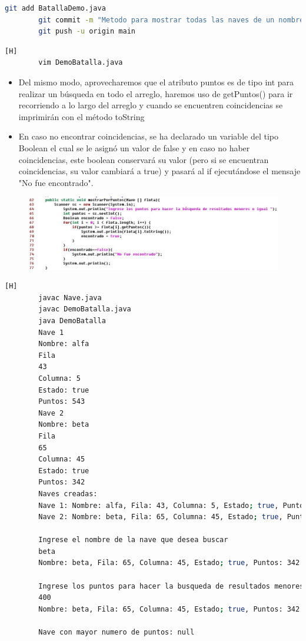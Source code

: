 \documentclass{article}
\begin{document}
	
	\begin{lstlisting}[language=bash,caption={Commit:"Metodo para mostrar todas las naves de un nombre que se pide por teclado" }]	
		git add BatallaDemo.java
		git commit -m "Metodo para mostrar todas las naves de un nombre que se pide por teclado"
		git push -u origin main
	\end{lstlisting}
	

	
	\begin{lstlisting}[language=bash,caption={Método mostrarPorPuntos }][H]
		vim DemoBatalla.java
	\end{lstlisting}
	
	\begin{itemize}	
		\item Del mismo modo, aprovecharemos que el atributo puntos  es de tipo int para realizar un búsqueda en todo el arreglo, haremos uso de getPuntos() para ir recorriendo a lo largo del arreglo y cuando se encuentren coincidencias se imprimirán con el método toString
		\item En caso no encontrar coincidencias, se ha declarado un variable del tipo Boolean el cual se le asignó un valor de false y en caso no haber coincidencias, este boolean conservará su valor (pero si se encuentran coincidencias, su valor cambiará a true) y pasará al if ejecutándose el mensaje "No fue encontrado".
	\end{itemize}
	
	\begin{figure}[H]
		\centering
		\includegraphics[width=1\textwidth,keepaspectratio]{img/6.jpg}
	\end{figure}
	
	\begin{lstlisting}[language=bash,caption={Compilando y ejecutando DemoBatalla.java con este último método implemenatdo }][H]
		javac Nave.java
		javac DemoBatalla.java
		java DemoBatalla
		Nave 1
		Nombre: alfa
		Fila
		43
		Columna: 5
		Estado: true
		Puntos: 543
		Nave 2
		Nombre: beta
		Fila
		65
		Columna: 45
		Estado: true
		Puntos: 342
		Naves creadas:
		Nave 1: Nombre: alfa, Fila: 43, Columna: 5, Estado; true, Puntos: 543
		Nave 2: Nombre: beta, Fila: 65, Columna: 45, Estado; true, Puntos: 342
		
		Ingrese el nombre de la nave que desea buscar
		beta
		Nombre: beta, Fila: 65, Columna: 45, Estado; true, Puntos: 342
		
		Ingrese los puntos para hacer la busqueda de resultados menores o igual
		400
		Nombre: beta, Fila: 65, Columna: 45, Estado; true, Puntos: 342
		
		Nave con mayor numero de puntos: null
	\end{lstlisting}
	
\end{document}
